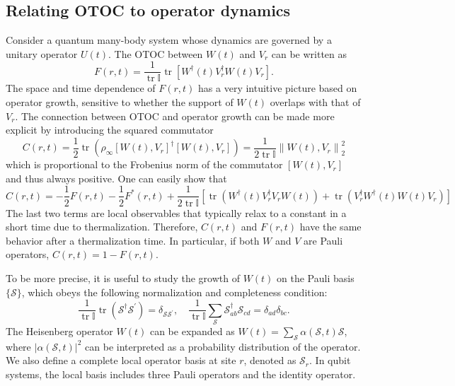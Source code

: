 \documentclass[aps,prb,superscriptaddress,nofootinbib]{revtex4}
\def \tr{\operatorname{tr}}
\begin{document}
\subsection{Relating OTOC to operator dynamics}
Consider a quantum many-body system whose dynamics are governed by a unitary operator $U(t)$. 
The OTOC between $W(t)$ and $V_r$ can be written as
\begin{equation}
	F(r, t)=\frac{1}{\tr \mathbb I} \tr\left[W^{\dagger}(t) V_r^{\dagger} W(t) V_r\right].
\end{equation}
The space and time dependence of $F(r, t)$ has a very intuitive picture based on operator growth, sensitive to whether the support of $W(t)$ overlaps with that of $V_r$. 
The connection between OTOC and operator growth can be made more explicit by introducing the squared commutator
\begin{equation}
	C(r, t)=\frac{1}{2} \tr\left(\rho_\infty \left[W(t), V_r\right]^{\dagger}\left[W(t), V_r\right]\right)
	=\frac{1}{2\tr \mathbb I}\left\|W(t), V_r\right\|_2^2
\end{equation}
which is proportional to the Frobenius norm of the commutator $\left[W(t), V_r\right]$ and thus always positive. 
One can easily show that
\begin{equation}
	C(r, t) = -\frac{1}{2}F(r, t)-\frac{1}{2}F^*(r, t) +\frac{1}{2\tr \mathbb I}\left[\tr\left(W^{\dagger}(t) V_r^{\dagger} V_r W(t)\right)+\tr\left(V_r^{\dagger} W^{\dagger}(t) W(t) V_r\right)\right]
\end{equation}
The last two terms are local observables that typically relax to a constant in a short time due to thermalization.
Therefore, $C(r, t)$ and $F(r, t)$ have the same behavior after a thermalization time. 
In particular, if both $W$ and $V$ are Pauli operators, $C(r, t)=1- F(r, t)$.

To be more precise, it is useful to study the growth of $W(t)$ on the Pauli basis $\{\mathcal{S}\}$, which obeys the following normalization and completeness condition:
\begin{equation}\label{eq:pauli-condition}
	\frac{1}{\operatorname{tr} \mathbb I} \operatorname{tr}\left(\mathcal{S}^{\dagger} \mathcal{S}^{\prime}\right)=\delta_{\mathcal{S} \mathcal{S}^{\prime}}, \quad \frac{1}{\operatorname{tr} \mathbb I} \sum_{\mathcal{S}} \mathcal{S}_{a b}^{\dagger} \mathcal{S}_{c d}=\delta_{a d} \delta_{b c}.
\end{equation}
The Heisenberg operator $W(t)$ can be expanded as $W(t)=\sum_{\mathcal{S}} \alpha(\mathcal{S}, t) \mathcal{S}$, where $|\alpha(\mathcal{S}, t)|^2$ can be interpreted as a probability distribution of the operator.
We also define a complete local operator basis at site $r$, denoted as $\mathcal{S}_r$. 
In qubit systems, the local basis includes three Pauli operators and the identity operator.
\end{document}

